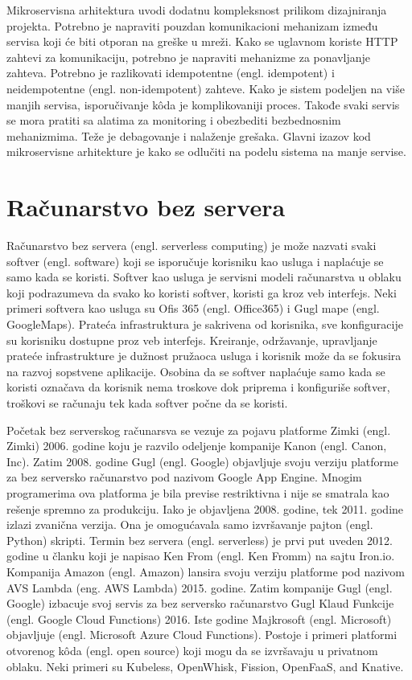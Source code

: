 \documentclass[12pt,oneside]{memoir}
\begin{document}
Mikroservisna arhitektura uvodi dodatnu kompleksnost prilikom dizajniranja projekta. Potrebno je napraviti pouzdan komunikacioni mehanizam između servisa koji će biti otporan na greške u mreži. Kako se uglavnom koriste HTTP zahtevi za komunikaciju, potrebno je napraviti mehanizme za ponavljanje zahteva. Potrebno je razlikovati idempotentne (engl. idempotent) i neidempotentne (engl. non-idempotent) zahteve. Kako je sistem podeljen na više manjih servisa, isporučivanje kôda je komplikovaniji proces. Takođe svaki servis se mora pratiti sa alatima za monitoring i obezbediti bezbednosnim mehanizmima. Teže je debagovanje i nalaženje grešaka. Glavni izazov kod mikroservisne arhitekture je kako se odlučiti na podelu sistema na manje servise\cite{bm}.

\chapter{Računarstvo bez servera}
\label{chp:razrada}

Računarstvo bez servera (engl. serverless computing) je može nazvati svaki softver (engl. software) koji se isporučuje korisniku kao usluga i naplaćuje se samo kada se koristi\cite{sa}. Softver kao usluga je servisni modeli računarstva u oblaku koji podrazumeva da svako ko koristi softver, koristi ga kroz veb interfejs. Neki primeri softvera kao usluga su Ofis 365 (engl. Office365) i Gugl mape (engl. GoogleMaps). Prateća infrastruktura je sakrivena od korisnika, sve konfiguracije su korisniku dostupne proz veb interfejs. Kreiranje, održavanje, upravljanje prateće infrastrukture je dužnost pružaoca usluga i korisnik može da se fokusira na razvoj sopstvene aplikacije. Osobina da se softver naplaćuje samo kada se koristi označava da korisnik nema troskove dok priprema i konfiguriše softver, troškovi se računaju tek kada softver počne da se koristi.

Početak bez serverskog računarsva se vezuje za pojavu platforme Zimki (engl. Zimki) 2006. godine koju je razvilo odeljenje kompanije Kanon (engl. Canon, Inc). Zatim 2008. godine Gugl (engl. Google) objavljuje svoju verziju platforme za bez serversko računarstvo pod nazivom Google App Engine. Mnogim programerima ova platforma je bila previse restriktivna i nije se smatrala kao rešenje spremno za produkciju\cite{ls}. Iako je objavljena 2008. godine, tek 2011. godine izlazi zvanična verzija. Ona je omogućavala samo izvršavanje pajton (engl. Python) skripti. Termin bez servera (engl. serverless) je prvi put uveden 2012. godine u članku koji je napisao Ken From (engl. Ken Fromm) na sajtu Iron.io\cite{wtfosaais}. Kompanija Amazon (engl. Amazon) lansira svoju verziju platforme pod nazivom AVS Lambda (eng. AWS Lambda) 2015. godine. Zatim kompanije Gugl (engl. Google) izbacuje svoj servis za bez serversko računarstvo Gugl Klaud Funkcije (engl. Google Cloud Functions) 2016. Iste godine Majkrosoft (engl. Microsoft) objavljuje (engl. Microsoft Azure Cloud Functions). Postoje i primeri platformi otvorenog kôda (engl. open source) koji mogu da se izvršavaju u privatnom oblaku. Neki primeri su Kubeless, OpenWhisk, Fission, OpenFaaS, and Knative\cite{ws}.
\end{document}
